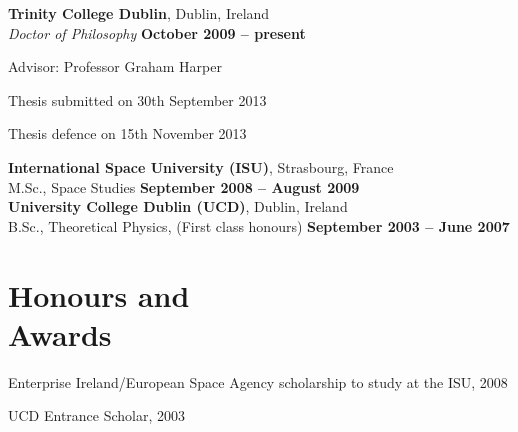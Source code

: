 \documentclass[margin,line]{resume}
\begin{document}
\begin{resume}
    \textbf{Trinity College Dublin}, Dublin, Ireland \vspace{1mm}\\\vspace{0.5mm}%
    \textsl{Doctor of Philosophy} \hfill \textbf{ October 2009 -- present}\vspace{-3mm}\\\vspace{-1mm}%
    \begin{list2}
        \item Advisor:  Professor Graham Harper
        \item  Thesis submitted on 30th September 2013
        \item  Thesis defence on 15th November 2013
    \end{list2}\vspace{-1.0mm}
    \textbf{International Space University (ISU)}, Strasbourg, France \vspace{0.5mm}\\\vspace{1mm}%
     M.Sc., Space Studies \hfill \textbf{ September 2008 -- August 2009}\vspace{3mm}\\\vspace{-1mm}
   \textbf{\hspace{-2.3mm} University College Dublin (UCD)}, Dublin, Ireland \vspace{1.5mm}\\\vspace{1mm}%
     B.Sc., Theoretical Physics, (First class honours) \hfill \textbf{ September 2003 -- June 2007}\vspace{-2mm}\\\vspace{-1mm}%

    \section{\mysidestyle Honours and\\Awards} 
	\begin{list2}
    \item Enterprise Ireland/European Space Agency scholarship to study at the ISU, 2008
    \item UCD Entrance Scholar, 2003 \vspace{-1mm}\\%
    \end{list2}   



\end{resume}
\end{document}
